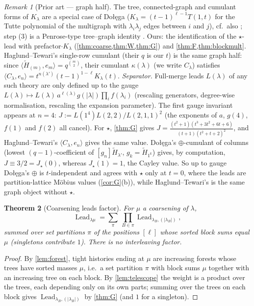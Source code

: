 \documentclass[11pt]{amsart}
\newtheorem{theorem}{Theorem}[section]
\theoremstyle{definition}
\theoremstyle{remark}
\newtheorem{remark}[theorem]{Remark}
\numberwithin{equation}{section}
\newcommand{\Lead}{\operatorname{Lead}}
\begin{document}
\begin{remark}[Prior art --- graph half]
The tree, connected-graph and cumulant forms of $K_\lambda$ are a special case of Do{\l}{\k{e}}ga \cite[Prop.~2.1 and (11), Lemma~2.3]{Dolega19} ($K_\lambda=(t-1)^{\ell-1}T(1,t)$ for the Tutte polynomial of the multigraph with $\lambda_i\lambda_j$ edges between $i$ and $j$), cf.\ also \cite{GesselSagan96,MallowsRiordan68}; step (3) is a Penrose-type tree--graph identity \cite{Penrose67}. Ours: the identification of the $\star$-lead with prefactor$\cdot K_\lambda$ (\cref{thm:coarse,thm:W,thm:G}) and \cref{thm:F,thm:blockmult}. Haglund--Tewari's single-row cumulant \cite[Def.~7.1, Thm.~7.3]{HaglundTewari26} (their $q$ is our $t$) is the same graph half: since $\langle\widetilde H_{(m)},e_m\rangle=q^{\binom m2}$, their cumulant $\kappa(\lambda)$ (we write $C_\lambda$) satisfies $\langle C_\lambda,e_n\rangle=t^{n(\lambda')}(t-1)^{1-\ell}K_\lambda(t)$.
\emph{Separator.} Full-merge leads $L(\lambda)$ of any such theory are only defined up to the gauge $L(\lambda)\mapsto L(\lambda)\,a^{\ell(\lambda)}g(|\lambda|)\prod_if(\lambda_i)$ (rescaling generators, degree-wise normalisation, rescaling the expansion parameter). The first gauge invariant appears at $n=4$: $J:=L(1^4)L(2,2)/L(2,1,1)^2$ (the exponents of $a$, $g(4)$, $f(1)$ and $f(2)$ all cancel). For $\star$, \cref{thm:G} gives $J=\frac{(t^2+1)(t^3+3t^2+6t+6)}{(t+1)(t^2+t+2)^2}$, and Haglund--Tewari's $\langle C_\lambda,e_n\rangle$ gives the same value. Do{\l}{\k{e}}ga's $\oplus$-cumulant of columns (lowest $(q-1)$-coefficient of $[g_n]\widetilde H_{\lambda'}$, $g_k=\widetilde H_{1^k}$) gives, by computation, $J\equiv 3/2=J_\star(0)$, whereas $J_\star(1)=1$, the Cayley value. So up to gauge Do{\l}{\k{e}}ga's $\oplus$ is $t$-independent and agrees with $\star$ only at $t=0$, where the leads are partition-lattice M\"obius values (\cref{cor:G}(b)), while Haglund--Tewari's is the same graph object without $\star$.
\end{remark}

\begin{theorem}[Coarsening leads factor]\label{thm:F}
For $\mu$ a coarsening of $\lambda$,
\[ \Lead_{\lambda\mu}=\sum_{\pi}\ \prod_{B\in\pi}\Lead_{\lambda_B,(|\lambda_B|)}, \]
summed over set partitions $\pi$ of the positions $[\ell]$ whose sorted block sums equal $\mu$ (singletons contribute $1$). There is no interleaving factor.
\end{theorem}
\begin{proof}
By \cref{lem:forest}, tight histories ending at $\mu$ are increasing forests whose trees have sorted masses $\mu$, i.e.\ a set partition $\pi$ with block sums $\mu$ together with an increasing tree on each block. By \cref{lem:telescope} the weight is a product over the trees, each depending only on its own parts; summing over the trees on each block gives $\Lead_{\lambda_B,(|\lambda_B|)}$ by \cref{thm:G} (and $1$ for a singleton).
\end{proof}
\end{document}
